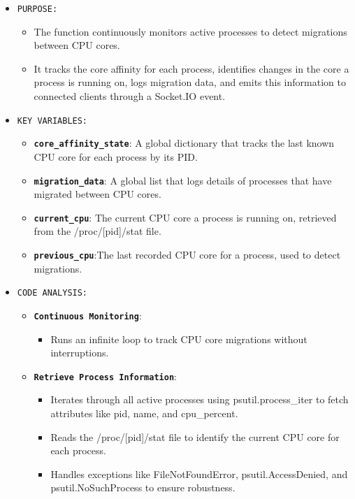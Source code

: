 \documentclass[12pt]{article}
\begin{document}
\begin{itemize}
    \item \texttt{PURPOSE:}
    \begin{itemize}
        \item The function continuously monitors active processes to detect migrations between CPU cores. 
        \item It tracks the core affinity for each process, identifies changes in the core a process is running on, logs migration data, and emits this information to connected clients through a Socket.IO event.
    \end{itemize}
    \item \texttt{KEY VARIABLES:}
    \begin{itemize}
        \item \textbf{\texttt{core\_affinity\_state}}: A global dictionary that tracks the last known CPU core for each process by its PID.
        \item \textbf{\texttt{migration\_data}}:  A global list that logs details of processes that have migrated between CPU cores.
        \item \textbf{\texttt{current\_cpu}}: The current CPU core a process is running on, retrieved from the /proc/[pid]/stat file.
        \item \textbf{\texttt{previous\_cpu}}:The last recorded CPU core for a process, used to detect migrations.
    \end{itemize}
    \item \texttt{CODE ANALYSIS:}
    \begin{itemize}
        \item \textbf{\texttt{Continuous Monitoring}}:
        \begin{itemize}
              \item Runs an infinite loop to track CPU core migrations without interruptions.
        \end{itemize}
       \item \textbf{\texttt{Retrieve Process Information}}:
       \begin{itemize}
            \item Iterates through all active processes using psutil.process\_iter to fetch attributes like pid, name, and cpu\_percent.
            \item Reads the /proc/[pid]/stat file to identify the current CPU core for each process.
            \item Handles exceptions like FileNotFoundError, psutil.AccessDenied, and psutil.NoSuchProcess to ensure robustness.

\end{itemize}
\end{itemize}
\end{itemize}
\end{document}
